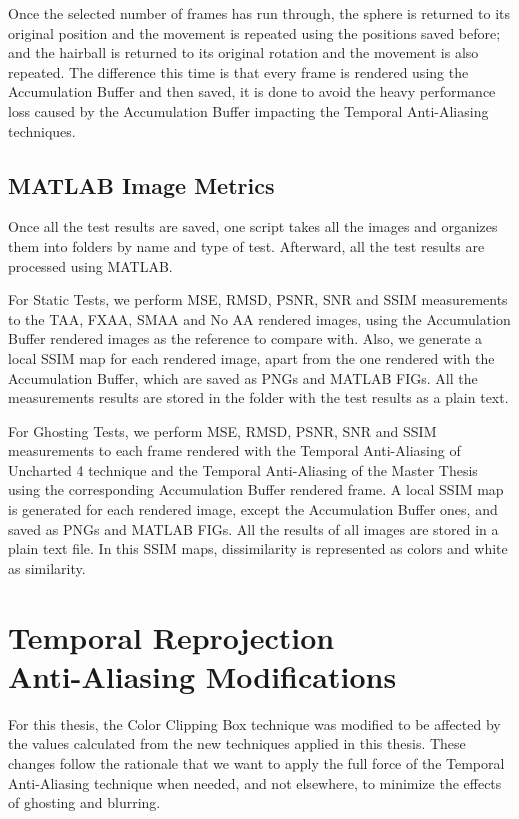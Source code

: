 \documentclass{cslthse-msc}
\begin{document}
Once the selected number of frames has run through, the sphere is returned to its original position and the movement is repeated using the positions saved before; and the hairball is returned to its original rotation and the movement is also repeated. The difference this time is that every frame is rendered using the Accumulation Buffer and then saved, it is done to avoid the heavy performance loss caused by the Accumulation Buffer impacting the Temporal Anti-Aliasing techniques.

\subsection{MATLAB Image Metrics}
Once all the test results are saved, one script takes all the images and organizes them into folders by name and type of test. Afterward, all the test results are processed using MATLAB.

For Static Tests, we perform MSE, RMSD, PSNR, SNR and SSIM measurements to the TAA, FXAA, SMAA and No AA rendered images, using the Accumulation Buffer rendered images as the reference to compare with. Also, we generate a local SSIM map for each rendered image, apart from the one rendered with the Accumulation Buffer, which are saved as PNGs and MATLAB FIGs. All the measurements results are stored in the folder with the test results as a plain text. 

For Ghosting Tests, we perform MSE, RMSD, PSNR, SNR and SSIM measurements to each frame rendered with the Temporal Anti-Aliasing of Uncharted 4 technique and the Temporal Anti-Aliasing of the Master Thesis using the corresponding Accumulation Buffer rendered frame. A local SSIM map is generated for each rendered image, except the Accumulation Buffer ones, and saved as PNGs and MATLAB FIGs. All the results of all images are stored in a plain text file. In this SSIM maps, dissimilarity is represented as colors and white as similarity.


\section[Temporal Reprojection Anti-Aliasing Modifications]{Temporal Reprojection \\ Anti-Aliasing Modifications}
For this thesis, the Color Clipping Box technique was modified to be affected by the values calculated from the new techniques applied in this thesis. These changes follow the rationale that we want to apply the full force of the Temporal Anti-Aliasing technique when needed, and not elsewhere, to minimize the effects of ghosting and blurring.
\end{document}
